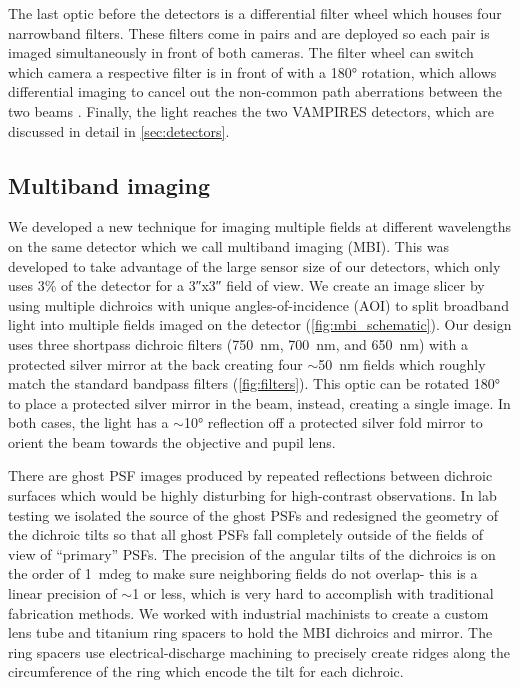 The last optic before the detectors is a differential filter wheel which houses four narrowband filters. These filters come in pairs and are deployed so each pair is imaged simultaneously in front of both cameras. The filter wheel can switch which camera a respective filter is in front of with a \ang{180} rotation, which allows differential imaging to cancel out the non-common path aberrations between the two beams \citep{uyama_high-contrast_2020}. Finally, the light reaches the two VAMPIRES detectors, which are discussed in detail in \autoref{sec:detectors}.

\subsection{Multiband imaging}

We developed a new technique for imaging multiple fields at different wavelengths on the same detector which we call multiband imaging (MBI). This was developed to take advantage of the large sensor size of our detectors, which only uses 3\% of the detector for a \ang{;;3}x\ang{;;3} field of view. We create an image slicer by using multiple dichroics with unique angles-of-incidence (AOI) to split broadband light into multiple fields imaged on the detector (\autoref{fig:mbi_schematic}). Our design uses three shortpass dichroic filters (\SI{750}{\nano\meter}, \SI{700}{\nano\meter}, and \SI{650}{\nano\meter}) with a protected silver mirror at the back creating four $\sim$\SI{50}{\nano\meter} fields which roughly match the standard bandpass filters (\autoref{fig:filters}). This optic can be rotated \ang{180} to place a protected silver mirror in the beam, instead, creating a single image. In both cases, the light has a $\sim$\ang{10} reflection off a protected silver fold mirror to orient the beam towards the objective and pupil lens.

There are ghost PSF images produced by repeated reflections between dichroic surfaces which would be highly disturbing for high-contrast observations. In lab testing we isolated the source of the ghost PSFs and redesigned the geometry of the dichroic tilts so that all ghost PSFs fall completely outside of the fields of view of ``primary'' PSFs. The precision of the angular tilts of the dichroics is on the order of \SI{1}{mdeg} to make sure neighboring fields do not overlap- this is a linear precision of $\sim$\SI{1}{\micron} or less, which is very hard to accomplish with traditional fabrication methods. We worked with industrial machinists to create a custom lens tube and titanium ring spacers to hold the MBI dichroics and mirror. The ring spacers use electrical-discharge machining to precisely create ridges along the circumference of the ring which encode the tilt for each dichroic.

